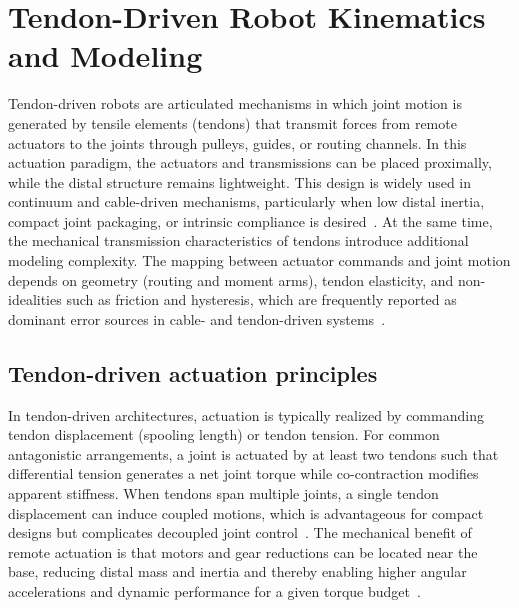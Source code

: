 \section{Tendon-Driven Robot Kinematics and Modeling}
\label{sec:tendon_robot}

Tendon-driven robots are articulated mechanisms in which joint motion is generated by tensile elements (tendons) that transmit forces from remote actuators to the joints through pulleys, guides, or routing channels. In this actuation paradigm, the actuators and transmissions can be placed proximally, while the distal structure remains lightweight. This design is widely used in continuum and cable-driven mechanisms, particularly when low distal inertia, compact joint packaging, or intrinsic compliance is desired~\cite{Rao2021TDCRModeling,Nemoto2022CableWrist}. At the same time, the mechanical transmission characteristics of tendons introduce additional modeling complexity. The mapping between actuator commands and joint motion depends on geometry (routing and moment arms), tendon elasticity, and non-idealities such as friction and hysteresis, which are frequently reported as dominant error sources in cable- and tendon-driven systems~\cite{Miyasaka2020HysteresisFriction,Kato2016Neuroendoscopy}.

\subsection{Tendon-driven actuation principles}

In tendon-driven architectures, actuation is typically realized by commanding tendon displacement (spooling length) or tendon tension. For common antagonistic arrangements, a joint is actuated by at least two tendons such that differential tension generates a net joint torque while co-contraction modifies apparent stiffness. When tendons span multiple joints, a single tendon displacement can induce coupled motions, which is advantageous for compact designs but complicates decoupled joint control~\cite{Rao2021TDCRModeling}. The mechanical benefit of remote actuation is that motors and gear reductions can be located near the base, reducing distal mass and inertia and thereby enabling higher angular accelerations and dynamic performance for a given torque budget~\cite{Nemoto2022CableWrist}.

